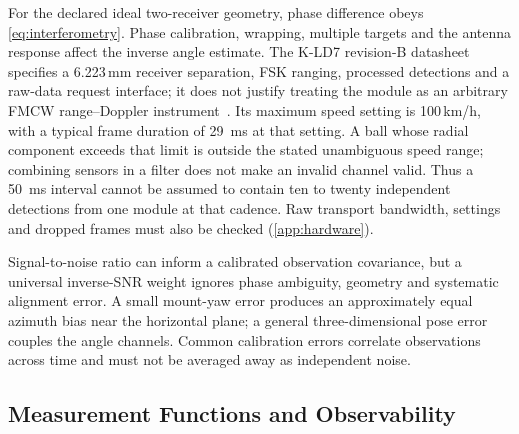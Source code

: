 For the declared ideal two-receiver geometry, phase difference obeys \cref{eq:interferometry}.
Phase calibration, wrapping, multiple targets and the antenna response affect the inverse angle estimate.
The K-LD7 revision-B datasheet specifies a 6.223\,mm receiver separation, FSK ranging, processed detections and a raw-data request interface; it does not justify treating the module as an arbitrary FMCW range--Doppler instrument~\cite{kld7}.
Its maximum speed setting is 100\,km/h, with a typical frame duration of \SI{29}{\milli\second} at that setting.
A ball whose radial component exceeds that limit is outside the stated unambiguous speed range; combining sensors in a filter does not make an invalid channel valid.
Thus a \SI{50}{\milli\second} interval cannot be assumed to contain ten to twenty independent detections from one module at that cadence.
Raw transport bandwidth, settings and dropped frames must also be checked (\cref{app:hardware}).

Signal-to-noise ratio can inform a calibrated observation covariance, but a universal inverse-SNR weight ignores phase ambiguity, geometry and systematic alignment error.
A small mount-yaw error produces an approximately equal azimuth bias near the horizontal plane; a general three-dimensional pose error couples the angle channels.
Common calibration errors correlate observations across time and must not be averaged away as independent noise.

\subsection{Measurement Functions and Observability}

